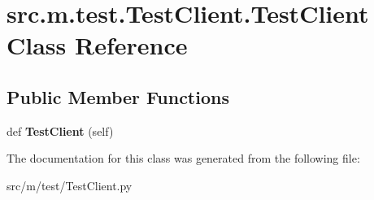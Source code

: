 \hypertarget{classsrc_1_1m_1_1test_1_1_test_client_1_1_test_client}{}\section{src.\+m.\+test.\+Test\+Client.\+Test\+Client Class Reference}
\label{classsrc_1_1m_1_1test_1_1_test_client_1_1_test_client}
\subsection*{Public Member Functions}
\begin{DoxyCompactItemize}
\item 
\hypertarget{classsrc_1_1m_1_1test_1_1_test_client_1_1_test_client_ad74001341ca1df41c76bb5be4e9c6db4}{}def {\bfseries Test\+Client} (self)\label{classsrc_1_1m_1_1test_1_1_test_client_1_1_test_client_ad74001341ca1df41c76bb5be4e9c6db4}

\end{DoxyCompactItemize}


The documentation for this class was generated from the following file\+:\begin{DoxyCompactItemize}
\item 
src/m/test/Test\+Client.\+py\end{DoxyCompactItemize}
